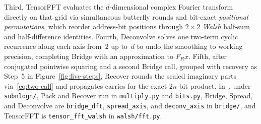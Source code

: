 Third, \textsf{TensorFFT} evaluates the $d$-dimensional complex Fourier transform directly on that grid via simultaneous butterfly rounds and bit-exact \emph{positional permutations}, which reorder address-bit positions through $2\times 2$ \emph{Walsh} half-sum and half-difference identities. Fourth, \textsf{Deconvolve} solves one two-term cyclic recurrence along each axis from~$2$ up to~$d$ to undo the smoothing to working precision, completing \textsf{Bridge} with an approximation to $F_R x$. Fifth, after conjugated pointwise squaring and a second \textsf{Bridge} call, grouped with recovery as Step~5 in Figure~\ref{fig:five-steps}, \textsf{Recover} rounds the scaled imaginary parts via~\eqref{eq:two-call} and propagates carries for the exact $2n$-bit product. In~\cite{Code26}, under \texttt{subnlogn/}, \textsf{Pack} and \textsf{Recover} run in \texttt{multiply.py} and \texttt{bits.py}, \textsf{Bridge}, \textsf{Spread}, and \textsf{Deconvolve} are \texttt{bridge\_\allowbreak dft}, \texttt{spread\_\allowbreak axis}, and \texttt{deconv\_\allowbreak axis} in \texttt{bridge/}, and \textsf{TensorFFT} is \texttt{tensor\_\allowbreak fft\_\allowbreak walsh} in \texttt{walsh/\allowbreak fft.py}.

